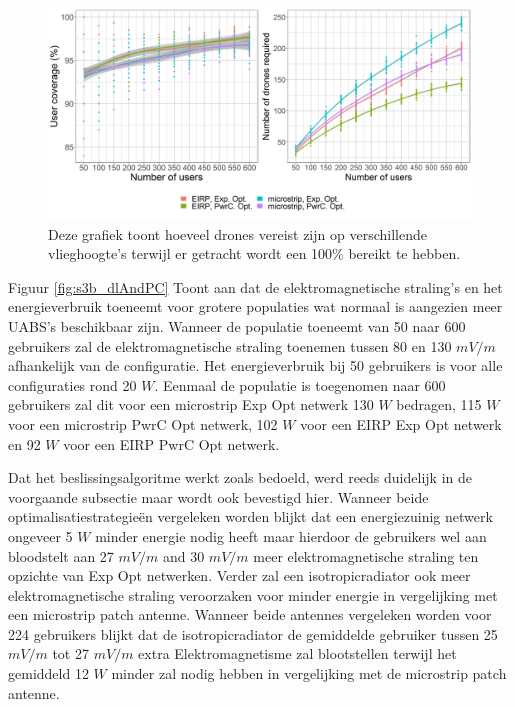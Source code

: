 \documentclass[twocolumn]{phdsymp_dutch}
\begin{document}
\begin{figure}[h]
  \includegraphics[width=\linewidth]{../results/s3/uvsnumdronesAndCov.png}
  \caption{Deze grafiek toont hoeveel drones vereist zijn op verschillende vlieghoogte's terwijl er getracht wordt een 100\% bereikt te hebben.}
  \label{fig:s3b_numdronesAndCov}
\end{figure}

Figuur \ref{fig:s3b_dlAndPC} Toont aan dat de elektromagnetische straling's en het energieverbruik toeneemt voor grotere populaties wat normaal is aangezien meer \gls{UABS}'s
beschikbaar zijn. Wanneer de populatie toeneemt van 50 naar 600 gebruikers zal 
de elektromagnetische straling toenemen tussen 80 en 130 $mV/m$ afhankelijk van de configuratie. 
Het energieverbruik bij 50 gebruikers is voor alle configuraties rond 20 $W$.
Eenmaal de populatie is toegenomen naar 600 gebruikers zal dit voor een
microstrip \gls{Exp Opt} netwerk 130 $W$ bedragen, 115 $W$ voor een microstrip \gls{PwrC Opt} netwerk,
102 $W$ voor een \gls{EIRP} \gls{Exp Opt} netwerk en 92 $W$ voor een  \gls{EIRP} \gls{PwrC Opt} netwerk.

Dat het beslissingsalgoritme werkt zoals bedoeld, werd reeds duidelijk in de voorgaande subsectie maar wordt
ook bevestigd hier. Wanneer beide optimalisatiestrategieën vergeleken worden 
blijkt dat een energiezuinig netwerk ongeveer 5 $W$ minder energie nodig heeft maar hierdoor de gebruikers wel aan 
bloodstelt aan 27 $mV/m$ and 30 $mV/m$ meer elektromagnetische straling ten opzichte van \gls{Exp Opt} netwerken.
Verder zal een \gls{isotropicradiator} ook meer elektromagnetische straling veroorzaken 
voor minder energie in vergelijking met een microstrip patch antenne.
Wanneer beide antennes vergeleken worden voor 224 gebruikers blijkt 
dat de \gls{isotropicradiator} de gemiddelde gebruiker tussen 
 25 $mV/m$ tot 27 $mV/m$ extra Elektromagnetisme zal blootstellen
 terwijl het gemiddeld 12 $W$ minder zal nodig hebben in vergelijking met de microstrip patch antenne.
\end{document}
